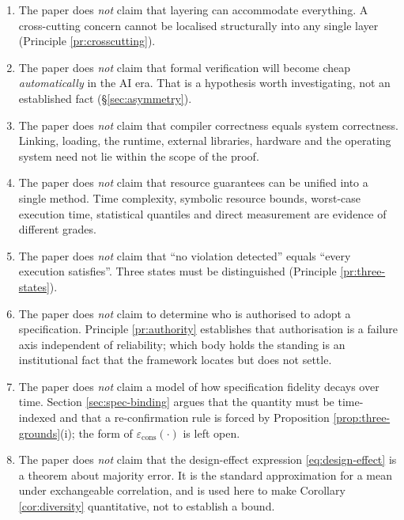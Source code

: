 \begin{enumerate}[label=(N\arabic*)]
      reliability. By Corollary \ref{cor:diversity}, reliability rises only when the
      correlated error mode falls.
\item The paper does \emph{not} claim that layering can accommodate everything. A
      cross-cutting concern cannot be localised structurally into any single layer
      (Principle \ref{pr:crosscutting}).
\item The paper does \emph{not} claim that formal verification will become cheap
      \emph{automatically} in the AI era. That is a hypothesis worth investigating, not an
      established fact (\S\ref{sec:asymmetry}).
\item The paper does \emph{not} claim that compiler correctness equals system correctness.
      Linking, loading, the runtime, external libraries, hardware and the operating system
      need not lie within the scope of the proof.
\item The paper does \emph{not} claim that resource guarantees can be unified into a single
      method. Time complexity, symbolic resource bounds, worst-case execution time,
      statistical quantiles and direct measurement are evidence of different grades.
\item The paper does \emph{not} claim that ``no violation detected'' equals ``every
      execution satisfies''. Three states must be distinguished (Principle
      \ref{pr:three-states}).
\item The paper does \emph{not} claim to determine who is authorised to adopt a specification.
      Principle \ref{pr:authority} establishes that authorisation is a failure axis independent of
      reliability; which body holds the standing is an institutional fact that the framework
      locates but does not settle.
\item The paper does \emph{not} claim a model of how specification fidelity decays over time.
      Section \ref{sec:spec-binding} argues that the quantity must be time-indexed and that a
      re-confirmation rule is forced by Proposition \ref{prop:three-grounds}(i); the form of
      $\varepsilon_{\text{cons}}(\cdot)$ is left open.
\item The paper does \emph{not} claim that the design-effect expression \eqref{eq:design-effect} is a
      theorem about majority error. It is the standard approximation for a mean under exchangeable
      correlation, and is used here to make Corollary \ref{cor:diversity} quantitative, not to
      establish a bound.
\end{enumerate}

